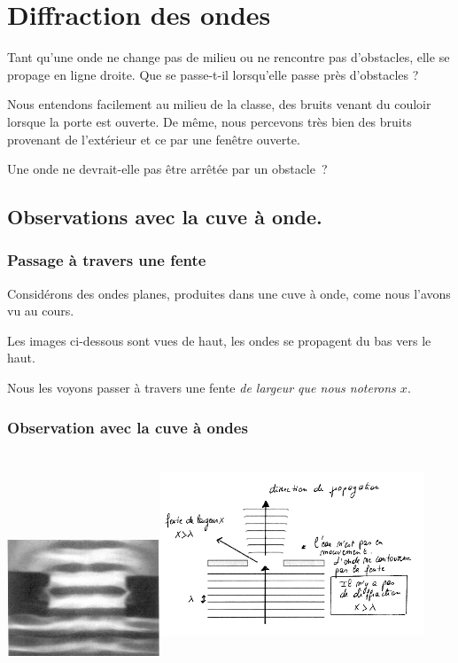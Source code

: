 \section{Diffraction des ondes}

Tant qu'une onde ne change pas de milieu ou ne rencontre pas
d'obstacles, elle se propage en ligne droite. Que se passe-t-il
lorsqu'elle passe près d'obstacles ?

Nous entendons facilement au milieu de la classe, des bruits venant du
couloir lorsque la porte est ouverte. De même, nous percevons très bien
des bruits provenant de l'extérieur et ce par une fenêtre ouverte.

Une onde ne devrait-elle pas être arrêtée par un obstacle~?

\subsection{Observations avec la cuve à onde. }

\subsubsection{Passage à travers une fente}

Considérons des ondes planes, produites dans une cuve à onde, come nous
l'avons vu au cours.

Les images ci-dessous sont vues de haut, les ondes se propagent du bas
vers le haut.

Nous les voyons passer à travers une fente \emph{de largeur que
nous noterons $x$}.

\subsubsection{Observation avec la cuve à ondes}

\includegraphics[width=4.546cm,height=3.468cm]{Pictures/1000000100000165000001102080785BE3C607F4.png}\includegraphics[width=7.895cm,height=6.091cm]{Pictures/10000001000002060000013F9C2B947BF01F091E.png}


